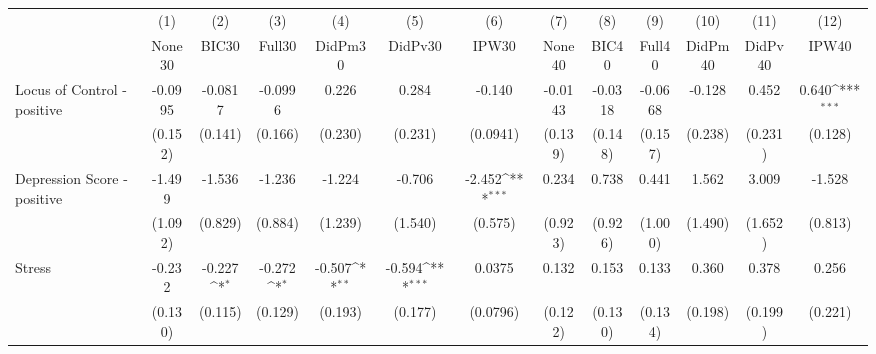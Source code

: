 {
\def\sym#1{\ifmmode^{#1}\else\(^{#1}\)\fi}
\begin{tabular}{l*{12}{c}}
\toprule
            &\multicolumn{1}{c}{(1)}&\multicolumn{1}{c}{(2)}&\multicolumn{1}{c}{(3)}&\multicolumn{1}{c}{(4)}&\multicolumn{1}{c}{(5)}&\multicolumn{1}{c}{(6)}&\multicolumn{1}{c}{(7)}&\multicolumn{1}{c}{(8)}&\multicolumn{1}{c}{(9)}&\multicolumn{1}{c}{(10)}&\multicolumn{1}{c}{(11)}&\multicolumn{1}{c}{(12)}\\
            &\multicolumn{1}{c}{None30}&\multicolumn{1}{c}{BIC30}&\multicolumn{1}{c}{Full30}&\multicolumn{1}{c}{DidPm30}&\multicolumn{1}{c}{DidPv30}&\multicolumn{1}{c}{IPW30}&\multicolumn{1}{c}{None40}&\multicolumn{1}{c}{BIC40}&\multicolumn{1}{c}{Full40}&\multicolumn{1}{c}{DidPm40}&\multicolumn{1}{c}{DidPv40}&\multicolumn{1}{c}{IPW40}\\
\midrule
Locus of Control - positive&     -0.0995         &     -0.0817         &     -0.0996         &       0.226         &       0.284         &      -0.140         &     -0.0143         &     -0.0318         &     -0.0668         &      -0.128         &       0.452         &       0.640\sym{***}\\
            &     (0.152)         &     (0.141)         &     (0.166)         &     (0.230)         &     (0.231)         &    (0.0941)         &     (0.139)         &     (0.148)         &     (0.157)         &     (0.238)         &     (0.231)         &     (0.128)         \\
\addlinespace
Depression Score - positive&      -1.499         &      -1.536         &      -1.236         &      -1.224         &      -0.706         &      -2.452\sym{***}&       0.234         &       0.738         &       0.441         &       1.562         &       3.009         &      -1.528         \\
            &     (1.092)         &     (0.829)         &     (0.884)         &     (1.239)         &     (1.540)         &     (0.575)         &     (0.923)         &     (0.926)         &     (1.000)         &     (1.490)         &     (1.652)         &     (0.813)         \\
\addlinespace
Stress      &      -0.232         &      -0.227\sym{*}  &      -0.272\sym{*}  &      -0.507\sym{**} &      -0.594\sym{***}&      0.0375         &       0.132         &       0.153         &       0.133         &       0.360         &       0.378         &       0.256         \\
            &     (0.130)         &     (0.115)         &     (0.129)         &     (0.193)         &     (0.177)         &    (0.0796)         &     (0.122)         &     (0.130)         &     (0.134)         &     (0.198)         &     (0.199)         &     (0.221)         \\

\end{tabular}}

